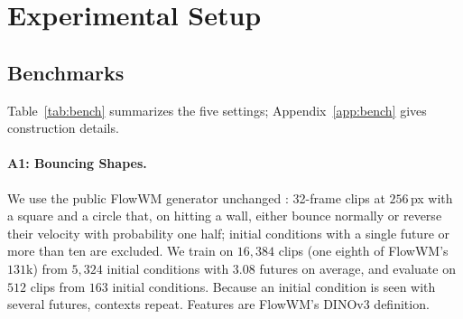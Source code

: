\section{Experimental Setup}
\label{sec:setup}

\subsection{Benchmarks}
\label{sec:bench}
Table~\ref{tab:bench} summarizes the five settings; Appendix~\ref{app:bench} gives construction details.

\begin{table}[t]
\caption{Benchmarks. ``Contexts repeat'' means that the same context appears in the training data with several different outcomes, which removes the possibility of memorizing the realized outcome.}
\label{tab:bench}
\begin{center}
\small
\setlength{\tabcolsep}{4pt}
\end{center}
\end{table}

\paragraph{A1: Bouncing Shapes.}
We use the public FlowWM generator unchanged \citep{porcher2026flowwm}: 32-frame clips at $256$\,px with a square and a circle that, on hitting a wall, either bounce normally or reverse their velocity with probability one half; initial conditions with a single future or more than ten are excluded. We train on $16{,}384$ clips (one eighth of FlowWM's $131$k) from $5{,}324$ initial conditions with $3.08$ futures on average, and evaluate on $512$ clips from $163$ initial conditions. Because an initial condition is seen with several futures, contexts repeat. Features are FlowWM's DINOv3 definition.

